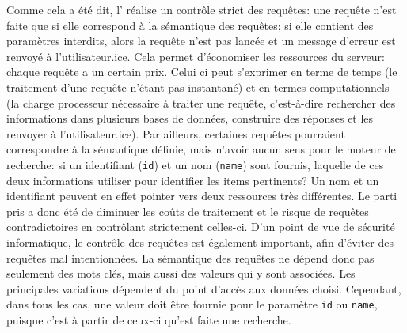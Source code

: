 Comme cela a été dit, l'\api{} réalise un contrôle strict des requêtes: une requête n'est faite que si elle correspond à la sémantique des requêtes; si elle contient des paramètres interdits, alors la requête n'est pas lancée et un message d'erreur est renvoyé à l'utilisateur.ice. Cela permet d'économiser les ressources du serveur: chaque requête a un certain prix. Celui ci peut s'exprimer en terme de temps (le traitement d'une requête n'étant pas instantané) et en termes computationnels (la charge processeur nécessaire à traiter une requête, c'est-à-dire rechercher des informations dans plusieurs bases de données, construire des réponses et les renvoyer à l'utilisateur.ice). Par ailleurs, certaines requêtes pourraient correspondre à la sémantique définie, mais n'avoir aucun sens pour le moteur de recherche: si un identifiant (\texttt{id}) et un nom (\texttt{name}) sont fournis, laquelle de ces deux informations utiliser pour identifier les items pertinents? Un nom et un identifiant peuvent en effet pointer vers deux ressources très différentes. Le parti pris a donc été de diminuer les coûts de traitement et le risque de requêtes contradictoires en contrôlant strictement celles-ci. D'un point de vue de sécurité informatique, le contrôle des requêtes est également important, afin d'éviter des requêtes mal intentionnées. La sémantique des requêtes ne dépend donc pas seulement des mots clés, mais aussi des valeurs qui y sont associées. Les principales variations dépendent du point d'accès aux données choisi. Cependant, dans tous les cas, une valeur doit être fournie pour le paramètre \texttt{id} ou \texttt{name}, puisque c'est à partir de ceux-ci qu'est faite une recherche. 

